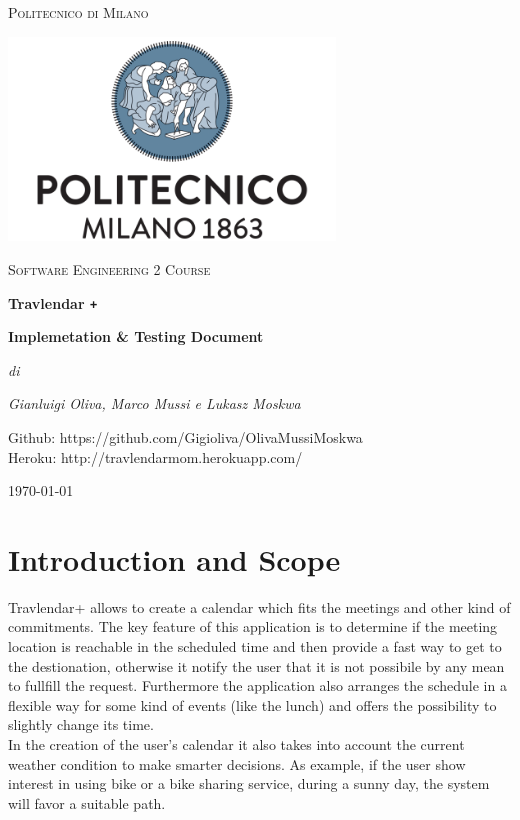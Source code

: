 \documentclass[numbers=noenddot, 12pt, a4paper, oneside]{scrbook}
\def\Plus{\texttt{+}}
\begin{document}
 
\begin{titlepage}
	\centering
	{\scshape\LARGE Politecnico di Milano \par}
	\vspace{1cm}
	\includegraphics[width=0.65\textwidth]{polimi-logo}\par
	\vspace{1cm}
		
	{\scshape\Large Software Engineering 2 Course\par}
	\vspace{1.5cm}
	{\huge\bfseries Travlendar \Plus \par}
	\vspace{1cm}
	{\Large\bfseries Implemetation \& Testing Document \par}
	\vspace{3cm}
	{\Large\itshape di\par}
	{\Large\itshape Gianluigi Oliva, Marco Mussi e Lukasz Moskwa\par}
	\vspace{1.5cm}
	Github: https://github.com/Gigioliva/OlivaMussiMoskwa\\
	Heroku: http://travlendarmom.herokuapp.com/
	\vfill

	
	\vfill
	
	{\large \today\par}
\end{titlepage}

\newpage 
\tableofcontents
\newpage 

\chapter{Introduction and Scope}
Travlendar+ allows to create a calendar which fits the meetings and other kind of commitments. The key feature of this application is to determine if the meeting location is reachable in the scheduled time and then provide a fast way to get to the destionation, otherwise it notify the user that it is not possibile by any mean to fullfill the request. Furthermore the application also arranges the schedule in a flexible way for some kind of events (like the lunch) and offers the possibility to slightly change its time.\\
In the creation of the user's calendar it also takes into account the current weather condition to make smarter decisions. As example, if the user show interest in using bike or a bike sharing service, during a sunny day, the system will favor a suitable path.\\\newline
\end{document}
